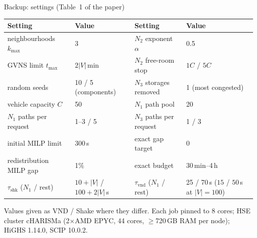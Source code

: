 \documentclass[aspectratio=169,10pt]{beamer}
\begin{document}
\appendix
{}

\begin{frame}{Backup: settings (Table~1 of the paper)}
\centering
\small
\renewcommand{\arraystretch}{1.15}
\setlength{\tabcolsep}{4pt}
\begin{tabular}{llll}
\toprule
Setting & Value & Setting & Value\\
\midrule
neighbourhoods $k_{\max}$ & 3 & $N_2$ exponent $\alpha$ & 0.5\\
GVNS limit $t_{\max}$ & $2|V|$\,min & $N_2$ free-room stop & $1C$ / $5C$\\
random seeds & 10 / 5 (components) & $N_3$ storages removed & 1 (most congested)\\
vehicle capacity $C$ & 50 & $N_1$ path pool & 20\\
$N_1$ paths per request & 1--3 / 5 & $N_3$ paths per request & 1 / 3\\
initial MILP limit & 300\,s & exact gap target & 0\\
redistribution MILP gap & 1\% & exact budget & 30\,min--4\,h\\
$\tau_{\mathrm{shk}}$ ($N_1$ / rest) & $10{+}|V|$ / $100{+}2|V|$\,s & $\tau_{\mathrm{vnd}}$ ($N_1$ / rest) & 25 / 70\,s ($15$ / $50$\,s at $|V|=100$)\\
\bottomrule
\end{tabular}

\medskip
{\footnotesize Values given as VND / Shake where they differ. Each job pinned to 8 cores;
HSE cluster cHARISMa (2$\times$AMD EPYC, 44 cores, $\ge$720\,GB RAM per node); HiGHS 1.14.0, SCIP 10.0.2.}
\end{frame}
\end{document}
